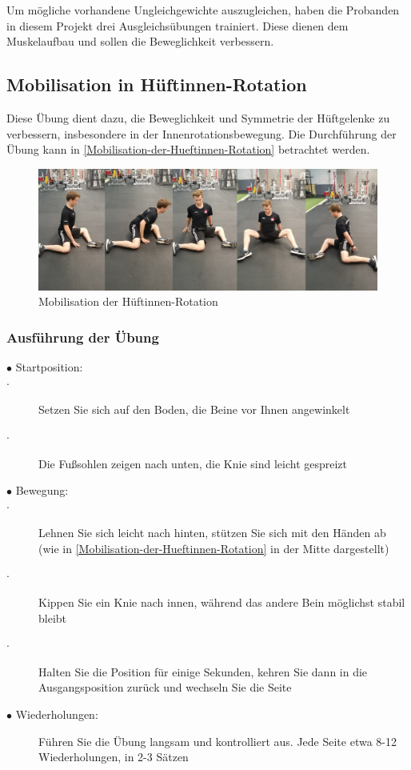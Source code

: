 Um mögliche vorhandene Ungleichgewichte auszugleichen, haben die Probanden in diesem Projekt drei Ausgleichsübungen trainiert.
Diese dienen dem Muskelaufbau und sollen die Beweglichkeit verbessern.

\subsection{Mobilisation in Hüftinnen-Rotation}
Diese Übung dient dazu, die Beweglichkeit und Symmetrie der Hüftgelenke zu verbessern, insbesondere in der Innenrotationsbewegung. Die Durchführung der Übung kann in \autoref{Mobilisation-der-Hueftinnen-Rotation} betrachtet werden.
\begin{figure}[h!]
    \centering
    \includegraphics[width=0.8\linewidth]{img/Hueftmobility-betterbodygroup.jpg}
    \caption{Mobilisation der Hüftinnen-Rotation \cite{betterbodygroup}}
    \label{Mobilisation-der-Hueftinnen-Rotation}
\end{figure}

\subsubsection{Ausführung der Übung}

\begin{description}
    \item[$\bullet$ Startposition:]
        \item[$\cdot$ ] Setzen Sie sich auf den Boden, die Beine vor Ihnen angewinkelt
        \item[$\cdot$] Die Fußsohlen zeigen nach unten, die Knie sind leicht gespreizt
    \item[$\bullet$ Bewegung:]
        \item[$\cdot$] Lehnen Sie sich leicht nach hinten, stützen Sie sich mit den Händen ab (wie in \autoref{Mobilisation-der-Hueftinnen-Rotation} in der Mitte dargestellt)
        \item[$\cdot$]Kippen Sie ein Knie nach innen, während das andere Bein möglichst stabil bleibt
        \item[$\cdot$] Halten Sie die Position für einige Sekunden, kehren Sie dann in die Ausgangsposition zurück und wechseln Sie die Seite
    \item[$\bullet$ Wiederholungen:]Führen Sie die Übung langsam und kontrolliert aus. Jede Seite etwa 8-12 Wiederholungen, in 2-3 Sätzen
\end{description}

